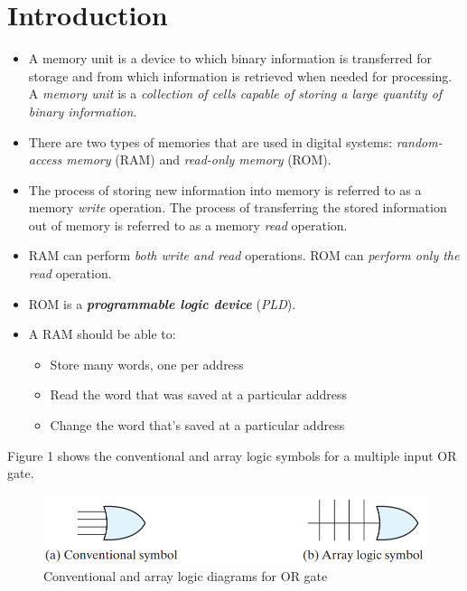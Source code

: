 \section{Introduction}
\label{sec:introduction}

\begin{itemize}[leftmargin=0.6cm]
  \item A memory unit is a device to which binary information is transferred for storage and from which information is retrieved when needed for processing. A \textit{memory unit} is a \textit{collection of cells capable of storing a large quantity of binary information}.
  \item There are two types of memories that are used in digital systems: \textit{random-access memory} (RAM) and \textit{read-only memory} (ROM).
  \item The process of storing new information into memory is referred to as a memory \textit{write} operation. The process of transferring the stored information out of memory is referred to as a memory \textit{read} operation.
  \item RAM can perform \textit{both write and read} operations. ROM can \textit{perform only the read} operation.
  \item ROM is a \textbf{\textit{programmable logic device}} (\textit{PLD}).
  \item A RAM should be able to:
  \begin{itemize}[leftmargin=0.6cm]
    \item Store many words, one per address
    \item Read the word that was saved at a particular address
    \item Change the word that’s saved at a particular address
  \end{itemize}
\end{itemize}

Figure 1 shows the conventional and array logic symbols for a multiple input OR gate.
\begin{figure}[H]
  \centering
  \includegraphics[width=\linewidth]{img/fig-7.1.png}
  \caption{Conventional and array logic diagrams for OR gate}
  \label{fig:7.1}
\end{figure}
